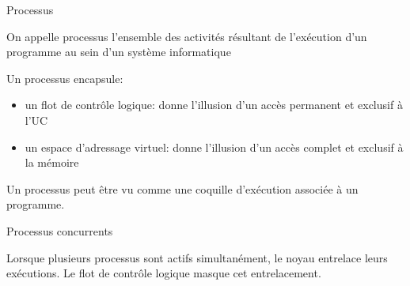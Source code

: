 \documentclass{beamer}
\begin{document}
{

\begin{frame}{Processus}

  \begin{definition}[Processus]
    On appelle \alert{processus} l'ensemble des activités résultant de l'exécution d'un programme au sein d'un système informatique

    Un processus encapsule:
    \begin{itemize}
      \item un flot de contrôle logique: donne l'illusion d'un accès permanent et exclusif à l'UC
      \item un espace d'adressage virtuel: donne l'illusion d'un accès complet et exclusif à la mémoire
    \end{itemize}

  \end{definition}

  Un processus peut être vu comme une coquille d'exécution associée à un programme.
\end{frame}

\begin{frame}{Processus concurrents}

  Lorsque plusieurs processus sont actifs simultanément, le noyau entrelace leurs exécutions.
  Le flot de contrôle logique masque cet entrelacement.

  \begin{center}
  \end{center}


\end{frame}}
\end{document}
